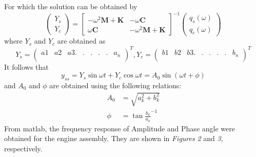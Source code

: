 \documentclass[11pt, oneside]{article}   	%
\begin{document}
For which the solution can be obtained by
\[ \begin{pmatrix}
Y_s \\
Y_c
\end{pmatrix} = \begin{bmatrix}
-\omega^2 \textbf{M} + \textbf{K} & -\omega \textbf{C}\\
\omega \textbf{C} & -\omega^2\textbf{M} + \textbf{K}
\end{bmatrix}^{-1} \begin{pmatrix}
q_s(\omega) \\
q_c(\omega)
\end{pmatrix}
\]
where $Y_s$ and $Y_c$ are obtained as
\[ Y_s = \begin{pmatrix}
a1 & a2 & a3 .&.&.&.&.&a_n \\
\end{pmatrix}^T, Y_c = \begin{pmatrix}
b1 & b2 & b3 .&.&.&.&.&b_n \\
\end{pmatrix}^T
\]
It follows that
\begin{equation}
y_{ss} = Y_s \sin{\omega t} + Y_c \cos{\omega t} = A_0 \sin{(\omega t + \phi)}
\end{equation}
and $A_0$ and $\phi$ are obtained using the following relations:
\begin{align}
A_0 &= \sqrt{a_k^2 + b_k^2} \\
\phi &= \tan{\frac{b_k}{a_k}}^{-1}
\end{align}
From matlab, the frequency response of Amplitude and Phase angle were obtained for the engine assembly. They are shown in \textit{Figures} \textit{2} and \textit{3}, respectively.
\end{document}
